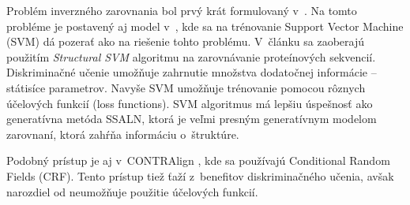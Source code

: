 Problém inverzného zarovnania bol prvý krát formulovaný v~\cite{inverseAlign1}.
Na tomto probléme je postavený aj model v~\cite{svmTrainingProteinsAlignment}, kde sa na trénovanie Support Vector Machine (SVM) dá pozerať ako na riešenie tohto problému. V~článku sa zaoberajú použitím \textit{Structural SVM} algoritmu na zarovnávanie proteínových sekvencií. Diskriminačné učenie umožňuje zahrnutie množstva dodatočnej informácie -- státisíce parametrov.
Navyše SVM umožňuje trénovanie pomocou rôznych účelových funkcií (loss functions).
SVM algoritmus má lepšiu úspešnosť ako generatívna metóda SSALN, ktorá je veľmi presným generatívnym modelom zarovnaní, ktorá zahŕňa informáciu o~štruktúre.

Podobný prístup je aj v~CONTRAlign \cite{contralign}, kde sa používajú Conditional Random Fields (CRF). Tento prístup tiež ťaží z~benefitov diskriminačného učenia, avšak narozdiel od \cite{svmTrainingProteinsAlignment} neumožňuje použitie účelových funkcií.
